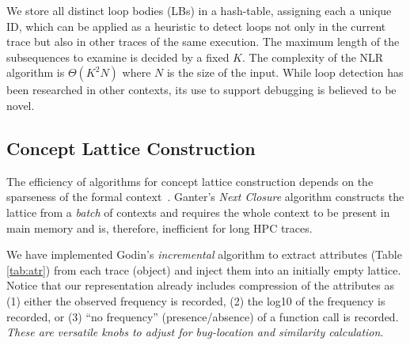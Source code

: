 %

We store all distinct loop bodies (LBs)
in a hash-table, assigning each a unique ID, which can be applied as
a heuristic to detect loops not only in the current trace but also in other
traces of the same execution.
%
The maximum length of the subsequences to examine is decided by a fixed $K$.
%
The complexity of the NLR algorithm is $\Theta(K^2N)$ where $N$ is the size of the input.
%
While loop detection has been researched in other contexts,
its use to support debugging is believed to be novel.

\subsection{Concept Lattice Construction}
\label{subsec:algo-cl}

%
The efficiency of algorithms for concept lattice construction
depends on the sparseness of the formal context~\cite{clgenperform}.
%
%
Ganter's \textit{Next Closure} algorithm \cite{clbook}
constructs the lattice from a
\textit{batch} of contexts and requires the whole context to be present in main memory and is, therefore, inefficient for long HPC traces.
%
%

%
We have implemented Godin's \textit{incremental} algorithm \cite{clconst}
to extract attributes (Table \ref{tab:atr})
from each trace (object) and inject them into an initially empty lattice.
%
Notice that our representation already includes compression of the attributes as (1) either the
observed frequency is recorded, (2) the log10 of the frequency is recorded, or (3) ``no frequency''
(presence/absence) of a function call is recorded.
%
{\em These are versatile knobs to adjust for bug-location and similarity calculation}.


